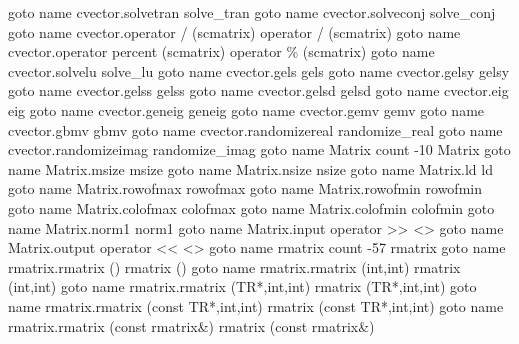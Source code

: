 \documentclass[12pt,letterpaper]{article}
\begin{document}
        \pdfoutline goto name {cvector.solvetran}                             {solve_tran}
        \pdfoutline goto name {cvector.solveconj}                             {solve_conj}
        \pdfoutline goto name {cvector.operator / (scmatrix)}                 {operator / (scmatrix)}
        \pdfoutline goto name {cvector.operator percent (scmatrix)}           {operator \% (scmatrix)}
        \pdfoutline goto name {cvector.solvelu}                               {solve_lu}
        \pdfoutline goto name {cvector.gels}                                  {gels}
        \pdfoutline goto name {cvector.gelsy}                                 {gelsy}
        \pdfoutline goto name {cvector.gelss}                                 {gelss}
        \pdfoutline goto name {cvector.gelsd}                                 {gelsd}
        \pdfoutline goto name {cvector.eig}                                   {eig}
        \pdfoutline goto name {cvector.geneig}                                {geneig}
        \pdfoutline goto name {cvector.gemv}                                  {gemv}
        \pdfoutline goto name {cvector.gbmv}                                  {gbmv}
        \pdfoutline goto name {cvector.randomizereal}                         {randomize_real}
        \pdfoutline goto name {cvector.randomizeimag}                         {randomize_imag}
    \pdfoutline goto name {Matrix} count -10 {Matrix}
        \pdfoutline goto name {Matrix.msize}          {msize}
        \pdfoutline goto name {Matrix.nsize}          {nsize}
        \pdfoutline goto name {Matrix.ld}             {ld}
        \pdfoutline goto name {Matrix.rowofmax}       {rowofmax}
        \pdfoutline goto name {Matrix.rowofmin}       {rowofmin}
        \pdfoutline goto name {Matrix.colofmax}       {colofmax}
        \pdfoutline goto name {Matrix.colofmin}       {colofmin}
        \pdfoutline goto name {Matrix.norm1}          {norm1}
        \pdfoutline goto name {Matrix.input}          {operator >> <>}
        \pdfoutline goto name {Matrix.output}         {operator << <>}
    \pdfoutline goto name {rmatrix} count -57 {rmatrix}
        \pdfoutline goto name {rmatrix.rmatrix ()}                            {rmatrix ()}
        \pdfoutline goto name {rmatrix.rmatrix (int,int)}                     {rmatrix (int,int)}
        \pdfoutline goto name {rmatrix.rmatrix (TR*,int,int)}                 {rmatrix (TR*,int,int)}
        \pdfoutline goto name {rmatrix.rmatrix (const TR*,int,int)}           {rmatrix (const TR*,int,int)}
        \pdfoutline goto name {rmatrix.rmatrix (const rmatrix&)}              {rmatrix (const rmatrix&)}
\end{document}

